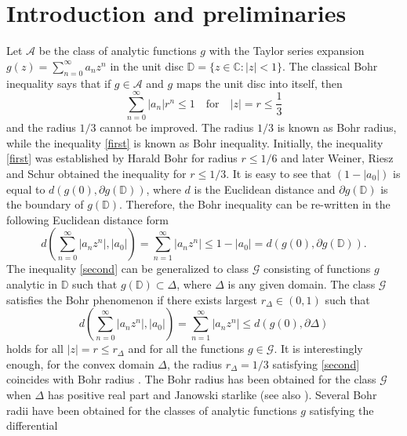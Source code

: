 \documentclass[12pt,a4paper,reqno]{amsart}
\theoremstyle{definition}
\theoremstyle{plain}
\numberwithin{equation}{section}
\begin{document}
\section{Introduction and preliminaries}
Let $\mathcal{A}$ be the class of analytic functions $g$ with the Taylor series expansion $g(z)=\sum_{n=0}^{\infty}a_nz^n$ in the unit disc $\mathbb{D}=\{ z \in \mathbb{C}: |z|<1 \}$. The classical Bohr inequality \cite{boh1914} says that if $g\in\mathcal{A}$  and  $g$ maps the unit disc into itself, then
\begin{equation}\label{first}
\sum_{n=0}^{\infty}|a_n|r^n\leq1\quad\text{for}\quad |z|=r\leq\frac{1}{3}
\end{equation}
and the radius  $1/3$ cannot be improved. The radius $1/3$ is known as Bohr radius, while the inequality \eqref{first} is known as Bohr inequality. Initially, the inequality \eqref{first} was established by Harald Bohr for radius $r\leq1/6$ and later Weiner, Riesz and Schur obtained the inequality for $r\leq1/3$. It is easy to see that $(1-|a_0|)$ is equal to $d(g(0), \partial g(\mathbb{D}))$, where $d$ is the Euclidean distance and $\partial g(\mathbb{D})$  is the boundary of $g(\mathbb{D})$. Therefore, the Bohr inequality can be re-written in the following Euclidean distance form
\begin{equation}\label{second}
d\left(\sum_{n=0}^{\infty}|a_nz^n|, |a_0|\right)=\sum_{n=1}^{\infty}|a_nz^n|\leq1-|a_0|=d(g(0), \partial g(\mathbb{D})).
\end{equation}
The inequality \eqref{second} can be generalized to class $\mathcal{G}$ consisting of functions $g$ analytic in $\mathbb{D}$ such that $g(\mathbb{D})\subset\Delta$, where $\Delta$ is any given domain. The class $\mathcal{G}$ satisfies the Bohr phenomenon if there exists largest $r_{\Delta}\in (0, 1)$ such that
\begin{equation*}%
d\left(\sum_{n=0}^{\infty}|a_nz^n|, |a_0|\right)=\sum_{n=1}^{\infty}|a_nz^n|\leq d(g(0), \partial \Delta)
\end{equation*}
holds for all $|z|=r\leq r_{\Delta}$ and for all the functions $g\in\mathcal{G}$. It is interestingly
enough, for the convex domain $\Delta$, the radius $r_{\Delta}=1/3$ satisfying \eqref{second} coincides with Bohr radius  \cite{aiz2007}. The Bohr radius has been obtained for the class $\mathcal{G}$ when $\Delta$ has positive real part \cite{Ali2019} and  Janowski starlike \cite{Ana2021} (see also \cite{Ahu2020}). Several  Bohr radii have been obtained for the classes of analytic functions $g$ satisfying the differential
\end{document}
